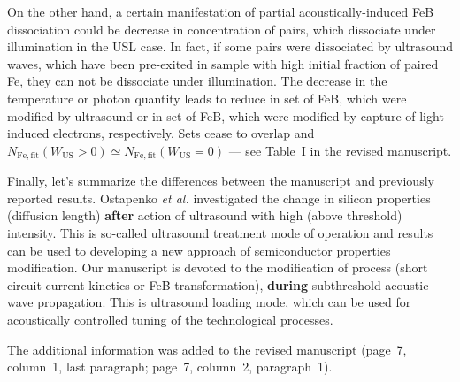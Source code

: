 \documentclass[aip,jap,preprint]{revtex4-1}
\begin{document}
On the other hand, a certain manifestation of partial acoustically-induced FeB dissociation could be
decrease in concentration of pairs, which dissociate under illumination in the USL case.
In fact, if some pairs were dissociated by  ultrasound waves, which have been pre-exited
in sample with high initial  fraction of paired Fe,
they can not be dissociate under illumination.
The decrease in the temperature   or photon quantity leads to reduce in set of FeB, which were modified by ultrasound or in set of FeB, which were modified by capture of light induced electrons, respectively.
Sets cease to overlap and $N_\mathrm{Fe,fit}(W_\mathrm{US}>0)\simeq N_\mathrm{Fe,fit}(W_\mathrm{US}=0)$ --- see Table~I in the revised manuscript.


Finally, let's summarize the differences between the manuscript and previously reported results.
Ostapenko \emph{et al.}\cite{Ostapenko1995,Ostapenko1994APL,Ostapenko1995SST}
investigated the change in silicon properties (diffusion length) \textbf{after}
action of ultrasound with high (above threshold) intensity.
This is so-called ultrasound treatment mode of operation
and results  can be used to developing a new approach of semiconductor properties modification.
Our manuscript is devoted to the modification of process
(short circuit current kinetics or FeB transformation),
\textbf{during} subthreshold acoustic wave propagation.
This is ultrasound loading mode,
which can be used for acoustically controlled tuning of the technological processes.

The additional information was added to the revised manuscript
(page~7, column~1, last paragraph; page~7, column~2, paragraph~1).


\end{document}
